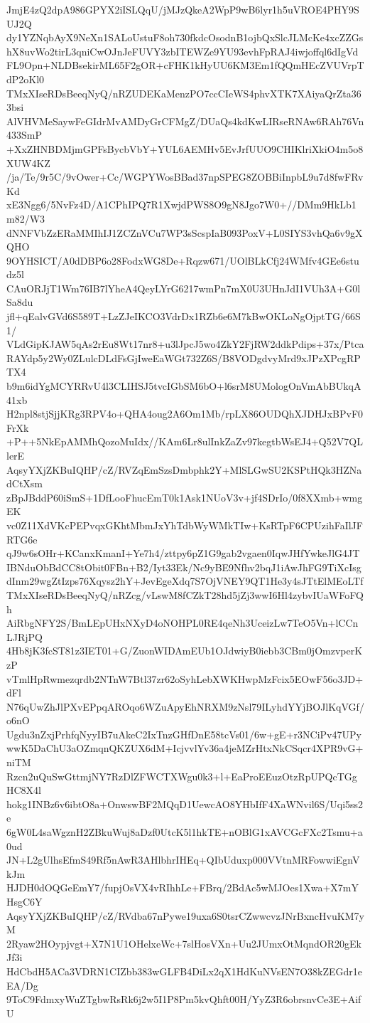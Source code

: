 JmjE4zQ2dpA986GPYX2iISLQqU/jMJzQkeA2WpP9wB6lyr1h5uVROE4PHY9SUJ2Q
dy1YZNqbAyX9NeXn1SALoUstuF8oh730fkdcOsodnB1ojbQxSlcJLMcKe4xcZZGs
hX8uvWo2tirL3qniCwOJnJeFUVY3zbITEWZe9YU93evhFpRAJ4iwjoffql6dIgVd
FL9Opn+NLDBsekirML65F2gOR+cFHK1kHyUU6KM3Em1fQQmHEcZVUVrpTdP2oKl0
TMxXIseRDsBeeqNyQ/nRZUDEKaMenzPO7ccCIeWS4phvXTK7XAiyaQrZta363bsi
AlVHVMeSaywFeGIdrMvAMDyGrCFMgZ/DUaQs4kdKwLIRseRNAw6RAh76Vn433SmP
+XxZHNBDMjmGPFsBycbVbY+YUL6AEMHv5EvJrfUUO9CHIKlriXkiO4m5o8XUW4KZ
/ja/Te/9r5C/9vOwer+Cc/WGPYWosBBad37npSPEG8ZOBBiInpbL9u7d8fwFRvKd
xE3Ngg6/5NvFz4D/A1CPhIPQ7R1XwjdPWS8O9gN8Jgo7W0+//DMm9HkLb1m82/W3
dNNFVbZzERaMMIhIJ1ZCZnVCu7WP3sScspIaB093PoxV+L0SIYS3vhQa6v9gXQHO
9OYHSICT/A0dDBP6o28FodxWG8De+Rqzw671/UOlBLkCfj24WMfv4GEe6studz5l
CAuORJjT1Wm76IB7lYheA4QeyLYrG6217wmPn7mX0U3UHnJdI1VUh3A+G0lSa8du
jfl+qEalvGVd6S589T+LzZJeIKCO3VdrDx1RZb6e6M7kBwOKLoNgOjptTG/66S1/
VLdGipKJAW5qAs2rEu8Wt17nr8+u3lJpcJ5wo4ZkY2FjRW2ddkPdips+37x/Ptca
RAYdp5y2Wy0ZLulcDLdFsGjIweEaWGt732Z6S/B8VODgdvyMrd9xJPzXPcgRPTX4
b9m6idYgMCYRRvU4l3CLIHSJ5tvcIGbSM6bO+l6srM8UMologOnVmAbBUkqA41xb
H2npl8stjSjjKRg3RPV4o+QHA4oug2A6Om1Mb/rpLX86OUDQhXJDHJxBPvF0FrXk
+P++5NkEpAMMhQozoMuIdx//KAm6Lr8ulInkZaZv97kegtbWsEJ4+Q52V7QLlerE
AqsyYXjZKBuIQHP/cZ/RVZqEmSzsDmbphk2Y+MlSLGwSU2KSPtHQk3HZNadCtXsm
zBpJBddP60iSmS+1DfLooFhucEmT0k1Ask1NUoV3v+jf4SDrIo/0f8XXmb+wmgEK
vc0Z11XdVKcPEPvqxGKhtMbmJxYhTdbWyWMkTIw+KsRTpF6CPUzihFaIlJFRTG6e
qJ9w6sOHr+KCanxKmanI+Ye7h4/zttpy6pZ1G9gab2vgaen0IqwJHfYwkeJlG4JT
IBNduObBdCC8tObit0FBn+B2/Iyt33Ek/Nc9yBE9Nfhv2bqJ1iAwJhFG9TiXcIsg
dInm29wgZtIzps76Xqysz2hY+JevEgeXdq7S7OjVNEY9QT1He3y4sJTtElMEoLTf
TMxXIseRDsBeeqNyQ/nRZcg/vLswM8fCZkT28hd5jZj3wwI6Hl4zybvIUaWFoFQh
AiRbgNFY2S/BmLEpUHxNXyD4oNOHPL0RE4qeNh3UceizLw7TeO5Vn+lCCnLJRjPQ
4Hb8jK3fcST81z3IET01+G/ZuonWIDAmEUb1OJdwiyB0iebb3CBm0jOmzvperKzP
vTmlHpRwmezqrdb2NTnW7Btl37zr62oSyhLebXWKHwpMzFcix5EOwF56o3JD+dFl
N76qUwZhJlPXvEPpqAROqo6WZuApyEhNRXM9zNsl79ILyhdYYjBOJlKqVGf/o6nO
Ugdu3nZxjPrhfqNyyIB7uAkeC2IxTnzGHfDnE58tcVs01/6w+gE+r3NCiPv47UPy
wwK5DaChU3aOZmqnQKZUX6dM+IcjvvlYv36a4jeMZrHtxNkCSqcr4XPR9vG+niTM
Rzcn2uQuSwGttmjNY7RzDlZFWCTXWgu0k3+l+EaProEEuzOtzRpUPQcTGgHC8X4l
hokg1INBz6v6ibtO8a+OnwswBF2MQqD1UewcAO8YHbIfF4XaWNvil6S/Uqi5ss2e
6gW0L4saWgznH2ZBkuWuj8aDzf0UtcK5l1hkTE+nOBlG1xAVCGcFXc2Tsmu+a0ud
JN+L2gUlhsEfmS49Rf5nAwR3AHlbhrIHEq+QIbUduxp000VVtnMRFowwiEgnVkJm
HJDH0dOQGeEmY7/fupjOsVX4vRIhhLe+FBrq/2BdAc5wMJOes1Xwa+X7mYHsgC6Y
AqsyYXjZKBuIQHP/cZ/RVdba67nPywe19uxa6S0tsrCZwwcvzJNrBxncHvuKM7yM
2Ryaw2HOypjvgt+X7N1U1OHelxeWc+7slHosVXn+Uu2JUmxOtMqndOR20gEkJf3i
HdCbdH5ACa3VDRN1CIZbb383wGLFB4DiLx2qX1HdKuNVsEN7O38kZEGdr1eEA/Dg
9ToC9FdmxyWuZTgbwRsRk6j2w5I1P8Pm5kvQhft00H/YyZ3R6obrsnvCe3E+AifU
